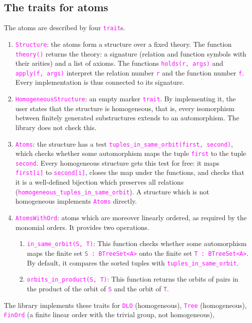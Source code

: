 \documentclass[12pt,a4paper,article]{memoir}
\newcommand{\code}[1]{\texttt{\textcolor{magenta}{#1}}}
\theoremstyle{definition}
\begin{document}
\subsection{The traits for atoms}
%
The atoms are described by four \code{trait}s.
\begin{enumerate}
\item \code{Structure}: the atoms form a structure over a fixed theory.
  The function \code{theory()} returns the theory: a signature (relation and function symbols with their arities) and a list of axioms.
  The functions \code{holds(r, args)} and \code{apply(f, args)} interpret the relation number \code{r} and the function number \code{f}.
  Every implementation is thus connected to its signature.
\item \code{HomogeneousStructure}: an empty marker \code{trait}.
  By implementing it, the user states that the structure is homogeneous, that is,
  every isomorphism between finitely generated substructures extends to an automorphism.
  The library does not check this.
\item \code{Atoms}: the structure has a test \code{tuples\_in\_same\_orbit(first, second)},
  which checks whether some automorphism maps the tuple \code{first} to the tuple \code{second}.
  Every homogeneous structure gets this test for free:
  it maps \code{first[i]} to \code{second[i]}, closes the map under the functions,
  and checks that it is a well-defined bijection which preserves all relations
  (\code{homogeneous\_tuples\_in\_same\_orbit}).
  A structure which is not homogeneous implements \code{Atoms} directly.
\item \code{AtomsWithOrd}: atoms which are moreover linearly ordered, as required by the monomial orders.
  It provides two operations.
  \begin{enumerate}
  \item \code{in\_same\_orbit(S, T)}: This function checks whether some automorphism maps the finite set \code{S : BTreeSet<A>} onto the finite set \code{T : BTreeSet<A>}.
    By default, it compares the sorted tuples with \code{tuples\_in\_same\_orbit}.
  \item \code{orbits\_in\_product(S, T)}: This function returns the orbits of pairs in the product of the orbit of \code{S} and the orbit of \code{T}.
  \end{enumerate}
\end{enumerate}
%
The library implements these traits for \code{DLO} (homogeneous), \code{Tree} (homogeneous),
\code{FinOrd} (a finite linear order with the trivial group, not homogeneous),
\end{document}
